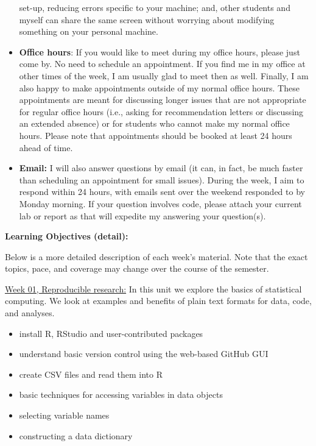 \documentclass[12pt]{article}
\begin{document}
\begin{itemize}
set-up, reducing errors specific to your machine; and, other students and
myself can share the same screen without worrying about modifying something
on your personal machine.
\item \textbf{Office hours}: If you would like to meet during my office hours,
please just come by. No need to schedule an appointment. If you find me in
my office at other times of the week, I am usually glad to meet then as well.
Finally, I am also happy to make appointments outside of my normal
office hours. These appointments are meant for discussing
longer issues that are not appropriate for regular office hours (i.e., asking
for recommendation letters or discussing an extended absence) or for students
who cannot make my normal office hours. Please note that appointments should
be booked at least 24 hours ahead of time.
\item \textbf{Email:} I will also answer questions by email (it can, in fact,
be much faster than scheduling an appointment for small issues). During the
week, I aim to respond within 24 hours, with emails sent over the weekend
responded to by Monday morning. If your question involves code, please attach
your current lab or report as that will expedite my answering your question(s).
\end{itemize}


\newpage

\textbf{Learning Objectives (detail):} \vspace{6pt}

Below is a more detailed description of each week's material. Note
that the exact topics, pace, and coverage may change over the course
of the semester.

\vspace{1.0cm}

\def\labelitemi{}
\def\labelitemii{}

\underline{Week 01, Reproducible research:}
In this unit we explore the basics of statistical computing.
We look at examples and benefits of plain text formats for data,
code, and analyses.
\begin{itemize}\setlength\itemsep{0em}
\item
  install R, RStudio and user-contributed packages
\item
  understand basic version control using the web-based GitHub GUI
\item
  create CSV files and read them into R
\item
  basic techniques for accessing variables in data objects
\item
  selecting variable names
\item
  constructing a data dictionary
\end{itemize}
\end{document}
